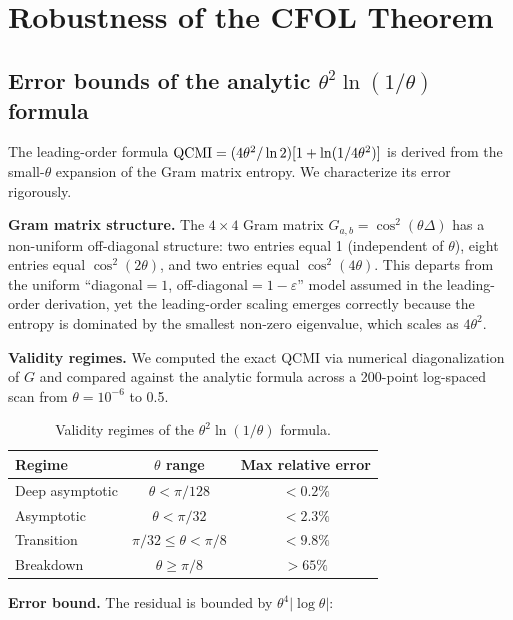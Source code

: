 \documentclass[aps,prl,superscriptaddress,nofootinbib]{revtex4-2}
\begin{document}
\section{Robustness of the CFOL Theorem}

\subsection{Error bounds of the analytic $\theta^2\ln(1/\theta)$ formula}

The leading-order formula ${\rm QCMI} = (4\theta^2/\ln 2)[1 + \ln(1/4\theta^2)]$ is derived from the small-$\theta$ expansion of the Gram matrix entropy. We characterize its error rigorously.

\textbf{Gram matrix structure.} The $4\times4$ Gram matrix $G_{a,b} = \cos^2(\theta\Delta)$ has a non-uniform off-diagonal structure: two entries equal 1 (independent of $\theta$), eight entries equal $\cos^2(2\theta)$, and two entries equal $\cos^2(4\theta)$. This departs from the uniform ``diagonal$=1$, off-diagonal$=1-\varepsilon$'' model assumed in the leading-order derivation, yet the leading-order scaling emerges correctly because the entropy is dominated by the smallest non-zero eigenvalue, which scales as $4\theta^2$.

\textbf{Validity regimes.} We computed the exact QCMI via numerical diagonalization of $G$ and compared against the analytic formula across a 200-point log-spaced scan from $\theta=10^{-6}$ to 0.5.

\begin{table}[h]
\caption{Validity regimes of the $\theta^2\ln(1/\theta)$ formula.}
\label{tab:validity}
\begin{ruledtabular}
\begin{tabular}{lcc}
Regime & $\theta$ range & Max relative error \\
\hline
Deep asymptotic & $\theta < \pi/128$ & $<0.2\%$ \\
Asymptotic & $\theta < \pi/32$ & $<2.3\%$ \\
Transition & $\pi/32 \leq \theta < \pi/8$ & $<9.8\%$ \\
Breakdown & $\theta \geq \pi/8$ & $>65\%$ \\
\end{tabular}
\end{ruledtabular}
\end{table}

\textbf{Error bound.} The residual is bounded by $\theta^4|\log\theta|$:
\end{document}
